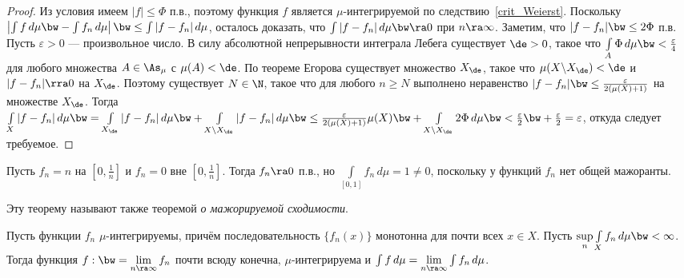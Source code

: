 \documentclass[10pt]{article}
\newcommand{\ve}{\varepsilon}
\begin{document}
\begin{proof}
Из условия имеем $|f|\le\Phi$ п.в., поэтому функция $f$ является
$\mu$-интегрируемой по следствию~\ref{crit_Weierst}. Поскольку
$\left|\int f\,d\mu\bw -\int f_n\,d\mu\right|\bw
\le\int|f-f_n|\,d\mu$, осталось доказать, что
$\int|f-f_n|\,d\mu\bw\ra0$ при $n\ra\infty$. Заметим, что
$|f-f_n|\bw\le 2\Phi$ п.в. Пусть $\ve>0$ --- произвольное число. В
силу абсолютной непрерывности интеграла Лебега существует $\de>0$,
такое что $\int\limits_A\Phi\,d\mu\bw <\frac{\ve}4$ для любого
множества $A\in\As_\mu$ с $\mu(A)<\de$. По теореме Егорова
существует множество $X_\de$, такое что $\mu(X\backslash X_\de)<\de$
и $|f-f_n|\rra0$ на $X_\de$. Поэтому существует $N\in\N$, такое что
для любого $n\ge N$ выполнено неравенство $|f-f_n|\bw
\le\frac{\ve}{2(\mu(X)+1)}$ на множестве $X_\de$. Тогда
$\int\limits_X|f-f_n|\,d\mu\bw =\int\limits_{X_\de}|f-f_n|\,d\mu\bw
+\int\limits_{X\backslash X_\de}|f-f_n|\,d\mu\bw
\le\frac{\ve}{2(\mu(X)+1)}\mu(X)\bw +\int\limits_{X\backslash
X_\de}2\Phi\,d\mu\bw <\frac{\ve}2\bw +\frac{\ve}2=\ve$, откуда
следует требуемое.
\end{proof}

\begin{ex}
Пусть $f_n=n$ на $[0,\frac1n]$ и $f_n=0$ вне $[0,\frac1n]$. Тогда
$f_n\ra0$ п.в., но $\int\limits_{[0,1]}f_n\,d\mu=1\ne0$, поскольку у
функций $f_n$ нет общей мажоранты.
\end{ex}

Эту теорему называют также теоремой \emph{о мажорируемой
сходимости}.

\begin{theorem}
Пусть функции $f_n$ $\mu$-интегрируемы, причём последовательность
$\{f_n(x)\}$ монотонна для почти всех $x\in X$. Пусть
$\sup\limits_n\int\limits_Xf_n\,d\mu\bw <\infty$. Тогда функция $f:
\bw=\lim\limits_{n\ra\infty}f_n$ почти всюду конечна,
$\mu$-интегрируема и $\int f\,d\mu=\lim\limits_{n\ra\infty}\int
f_n\,d\mu$.
\end{theorem}
\end{document}
